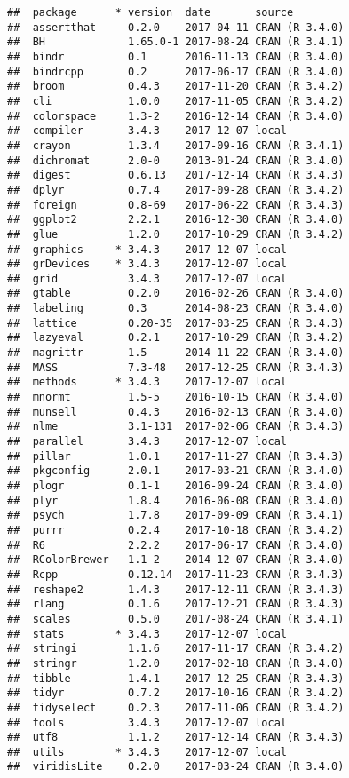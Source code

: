 \begin{verbatim}
##  package      * version  date       source        
##  assertthat     0.2.0    2017-04-11 CRAN (R 3.4.0)
##  BH             1.65.0-1 2017-08-24 CRAN (R 3.4.1)
##  bindr          0.1      2016-11-13 CRAN (R 3.4.0)
##  bindrcpp       0.2      2017-06-17 CRAN (R 3.4.0)
##  broom          0.4.3    2017-11-20 CRAN (R 3.4.2)
##  cli            1.0.0    2017-11-05 CRAN (R 3.4.2)
##  colorspace     1.3-2    2016-12-14 CRAN (R 3.4.0)
##  compiler       3.4.3    2017-12-07 local         
##  crayon         1.3.4    2017-09-16 CRAN (R 3.4.1)
##  dichromat      2.0-0    2013-01-24 CRAN (R 3.4.0)
##  digest         0.6.13   2017-12-14 CRAN (R 3.4.3)
##  dplyr          0.7.4    2017-09-28 CRAN (R 3.4.2)
##  foreign        0.8-69   2017-06-22 CRAN (R 3.4.3)
##  ggplot2        2.2.1    2016-12-30 CRAN (R 3.4.0)
##  glue           1.2.0    2017-10-29 CRAN (R 3.4.2)
##  graphics     * 3.4.3    2017-12-07 local         
##  grDevices    * 3.4.3    2017-12-07 local         
##  grid           3.4.3    2017-12-07 local         
##  gtable         0.2.0    2016-02-26 CRAN (R 3.4.0)
##  labeling       0.3      2014-08-23 CRAN (R 3.4.0)
##  lattice        0.20-35  2017-03-25 CRAN (R 3.4.3)
##  lazyeval       0.2.1    2017-10-29 CRAN (R 3.4.2)
##  magrittr       1.5      2014-11-22 CRAN (R 3.4.0)
##  MASS           7.3-48   2017-12-25 CRAN (R 3.4.3)
##  methods      * 3.4.3    2017-12-07 local         
##  mnormt         1.5-5    2016-10-15 CRAN (R 3.4.0)
##  munsell        0.4.3    2016-02-13 CRAN (R 3.4.0)
##  nlme           3.1-131  2017-02-06 CRAN (R 3.4.3)
##  parallel       3.4.3    2017-12-07 local         
##  pillar         1.0.1    2017-11-27 CRAN (R 3.4.3)
##  pkgconfig      2.0.1    2017-03-21 CRAN (R 3.4.0)
##  plogr          0.1-1    2016-09-24 CRAN (R 3.4.0)
##  plyr           1.8.4    2016-06-08 CRAN (R 3.4.0)
##  psych          1.7.8    2017-09-09 CRAN (R 3.4.1)
##  purrr          0.2.4    2017-10-18 CRAN (R 3.4.2)
##  R6             2.2.2    2017-06-17 CRAN (R 3.4.0)
##  RColorBrewer   1.1-2    2014-12-07 CRAN (R 3.4.0)
##  Rcpp           0.12.14  2017-11-23 CRAN (R 3.4.3)
##  reshape2       1.4.3    2017-12-11 CRAN (R 3.4.3)
##  rlang          0.1.6    2017-12-21 CRAN (R 3.4.3)
##  scales         0.5.0    2017-08-24 CRAN (R 3.4.1)
##  stats        * 3.4.3    2017-12-07 local         
##  stringi        1.1.6    2017-11-17 CRAN (R 3.4.2)
##  stringr        1.2.0    2017-02-18 CRAN (R 3.4.0)
##  tibble         1.4.1    2017-12-25 CRAN (R 3.4.3)
##  tidyr          0.7.2    2017-10-16 CRAN (R 3.4.2)
##  tidyselect     0.2.3    2017-11-06 CRAN (R 3.4.2)
##  tools          3.4.3    2017-12-07 local         
##  utf8           1.1.2    2017-12-14 CRAN (R 3.4.3)
##  utils        * 3.4.3    2017-12-07 local         
##  viridisLite    0.2.0    2017-03-24 CRAN (R 3.4.0)
\end{verbatim}

